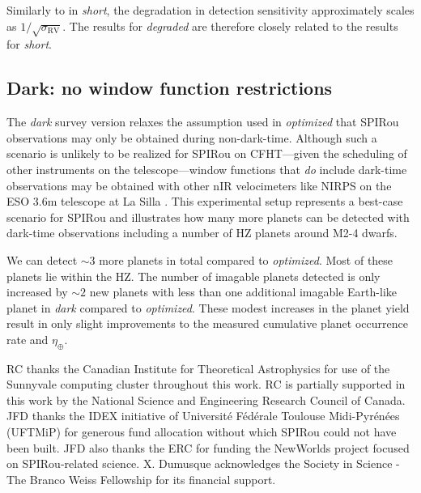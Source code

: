 Similarly to in \emph{short}, the degradation in detection sensitivity approximately scales as
$1/\sqrt{\sigma_{\text{RV}}}$. The results for \emph{degraded} are therefore closely related to the results for
\emph{short}.

\subsection{Dark: no window function restrictions}
The \emph{dark} survey version relaxes the assumption used in \emph{optimized} that SPIRou observations may
only be obtained during non-dark-time. Although such a scenario is unlikely to be realized for SPIRou on
CFHT---given the scheduling of other instruments on the telescope---window functions that \emph{do} include
dark-time observations may be obtained with other nIR velocimeters like
NIRPS on the ESO 3.6m telescope at La Silla \citep{bouchy17}. This experimental setup represents a best-case
scenario for SPIRou and illustrates how many more planets can be detected with dark-time observations
including a number of HZ planets around M2-4 dwarfs.

We can detect $\sim 3$ more planets in total compared to \emph{optimized}. Most of these planets lie within
the HZ. The number of imagable planets detected is only increased by $\sim 2$ new planets with less than one
additional imagable Earth-like planet in \emph{dark} compared to \emph{optimized}. These modest increases in
the planet yield result in only slight improvements to the measured cumulative planet occurrence rate and
$\eta_{\oplus}$.


\acknowledgements
RC thanks the Canadian Institute for Theoretical Astrophysics for use of the Sunnyvale
computing cluster throughout this work.
RC is partially supported in this work by the National Science and Engineering Research
Council of Canada.
JFD thanks the IDEX initiative of Universit\'e F\'ed\'erale Toulouse Midi-Pyr\'en\'ees (UFTMiP) for generous
fund allocation without which SPIRou could not have been built. JFD also thanks the ERC for funding the
NewWorlds project focused on SPIRou-related science.
X. Dumusque acknowledges the Society in Science - The Branco Weiss Fellowship for its financial support.


\appendix
